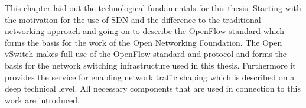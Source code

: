 This chapter laid out the technological fundamentals for this thesis. Starting with the motivation for the use of SDN and the difference to the traditional networking approach and going on to describe the OpenFlow standard which forms the basis for the work of the Open Networking Foundation. The Open vSwitch makes full use of the OpenFlow standard and protocol and forms the basis for the network switching infrastructure used in this thesis. Furthermore it provides the service for enabling network traffic shaping which is described on a deep technical level. All necessary components that are used in connection to this work are introduced.